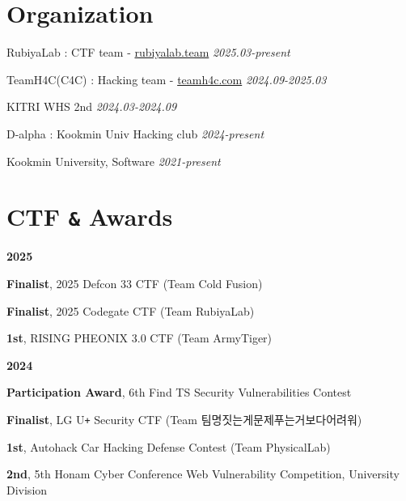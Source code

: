 \documentclass[margin,line]{resume}
\begin{document}
\begin{resume}
 	

 	    \section{\mysidestyle Organization}%
 	      \begin{list2}
 	      \item{RubiyaLab : CTF team - \href{https://rubiyalab.team}{rubiyalab.team} \hfill \textsl{2025.03-present}}
            \item{TeamH4C(C4C) : Hacking team - \href{https://teamh4c.com}{teamh4c.com} \hfill \textsl{2024.09-2025.03}}
 	      \item{KITRI WHS 2nd  \hfill \textsl{2024.03-2024.09}}
            \item{D-alpha : Kookmin Univ Hacking club  \hfill \textsl{2024-present}}
 	      \item{Kookmin University, Software  \hfill \textsl{2021-present}}
 	      
 	      \end{list2}


        \section{\mysidestyle CTF \texttt{\&} Awards}
      
        \textbf{2025}
        \vspace{1mm}
        \begin{list2}
          \item \textbf{Finalist}, 2025 Defcon 33 CTF (Team Cold Fusion)
          \item \textbf{Finalist}, 2025 Codegate CTF (Team RubiyaLab)
          \item \textbf{1st}, RISING PHEONIX 3.0 CTF (Team ArmyTiger)
        \end{list2}
        
        \textbf{2024}
        \vspace{1mm}
        \begin{list2}
          \item \textbf{Participation Award}, 6th Find TS Security Vulnerabilities Contest
          \item \textbf{Finalist}, LG U\texttt{+} Security CTF (Team 팀명짓는게문제푸는거보다어려워)
          \item \textbf{1st}, Autohack Car Hacking Defense Contest (Team PhysicalLab)
          \item \textbf{2nd}, 5th Honam Cyber Conference Web Vulnerability Competition, University Division
        \end{list2}


\end{resume}
\end{document}
